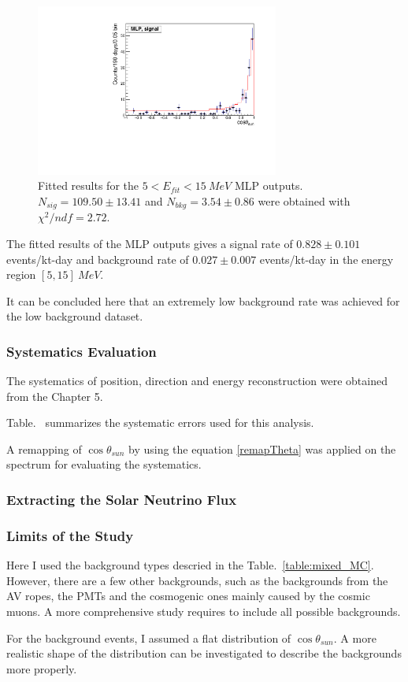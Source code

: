 \begin{figure}[!htb]
	\centering
	\includegraphics[width=8cm]{wholedataFit_mlp.pdf}
	\caption{Fitted results for the $5<E_{fit}<15~MeV$ MLP outputs. $N_{sig}=109.50\pm13.41$ and $N_{bkg}=3.54\pm0.86$ were obtained with $\chi^2/ndf=2.72$.}
	\label{wholeDataset_poissonFit_mlp}
\end{figure} 

The fitted results of the MLP outputs gives a signal rate of $0.828\pm0.101$ events/kt-day and background rate of $0.027\pm 0.007$ events/kt-day in the energy region $[5,15]~MeV$.

It can be concluded here that an extremely low background rate was achieved for the low background dataset.

\subsubsection{Systematics Evaluation}
The systematics of position, direction and energy reconstruction were obtained from the Chapter 5.

Table.~ summarizes the systematic errors used for this analysis.


A remapping of $\cos\theta_{sun}$ by using the equation \ref{remapTheta} was applied on the spectrum for 
evaluating the systematics.








\subsubsection{Extracting the Solar Neutrino Flux}


\subsubsection{Limits of the Study}
Here I used the background types descried in the Table.~\ref{table:mixed_MC}. However, there are a few other backgrounds, such as the backgrounds from the AV ropes, the PMTs and the cosmogenic ones mainly caused by the cosmic muons. A more comprehensive study requires to include all possible backgrounds.

For the background events, I assumed a flat distribution of $\cos\theta_{sun}$. A more realistic shape of the distribution can be investigated to describe the backgrounds more properly.  


